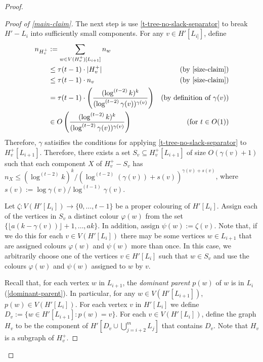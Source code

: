 \documentclass[kpfonts]{patmorin}
\theoremstyle{named}
\begin{document}
\begin{proof}
\begin{proof}[Proof of \cref{main-claim}]

       The next step is use \cref{t-tree-no-slack-separator} to break $H'-L_i$ into sufficiently small components.  For any $v\in H'[L_{i]}]$, define
       \begin{align*}
          n_{H^+_v} & := \sum_{w\in V(H^+_v)[L_{i+1}]} n_w \\
                    & \le \tau(t-1)\cdot|H^+_v| & \text{(by \cref{size-claim})} \\
                    & \le \tau(t-1)\cdot n_v & \text{(by \cref{size-claim})} \\
                    & = \tau(t-1)\cdot\left(\frac{(\log^{(t-2)}k)^k}{(\log^{(t-2)}\gamma(v))^{\gamma(v)}}\right)
                    & \text{(by definition of $\gamma(v)$)} \\
                    & \in O\left(\frac{(\log^{(t-2)}k)^k}{(\log^{(t-2)}\gamma(v))^{\gamma(v)}}\right) &\text{(for $t\in O(1)$)}
       \end{align*}
       Therefore, $\gamma$ satisifies the conditions for applying \cref{t-tree-no-slack-separator} to $H^+_v[L_{i+1}]$.  Therefore, there exists a set $S_v\subseteq H^+_v[L_{i+1}]$ of size $O(\gamma(v)+1)$ such that each component $X$ of $H^+_v-S_v$ has $n_X\le (\log^{(t-2)} k)^k/(\log^{(t-2)} (\gamma(v))+s(v))^{\gamma(v)+s(v)}$, where $s(v):=\log\gamma(v)/\log^{(t-1)}\gamma(v)$.

       Let $\zeta:V(H'[L_i])\to\{0,\ldots,t-1\}$ be a proper colouring of $H'[L_i]$.  Assign each of the vertices in $S_v$ a distinct colour $\varphi(w)$ from the set $\{\lfloor a(k-\gamma(v))\rfloor+1,\ldots,ak\}$.  In addition, assign $\psi(w):=\zeta(v)$.  Note that, if we do this for each $v\in V(H'[L_i])$ there may be some vertices $w\in L_{i+1}$ that are assigned colours $\varphi(w)$ and $\psi(w)$ more than once.  In this case, we arbitrarily choose one of the vertices $v\in H'[L_i]$ such that $w\in S_v$ and use the colours $\varphi(w)$ and $\psi(w)$ assigned to $w$ by $v$.

       Recall that, for each vertex $w$ in $L_{i+1}$, the \emph{dominant parent} $p(w)$ of $w$ is in $L_i$ (\cref{dominant-parent}).  In particular, for any $w\in V(H'[L_{i+1}])$, $p(w)\in V(H'[L_{i}])$.
       For each vertex $v$ in $H'[L_i]$ we define $D_v:=\{w\in H'[L_{i+1}]: p(w)=v\}$.  For each $v\in V(H'[L_i])$, define the graph $H_v$ to be the component of $H'[D_v\cup \bigcup_{j=i+2}^m L_j]$ that contains $D_v$.  Note that $H_v$ is a subgraph of $H^+_v$.


\end{proof}
\end{proof}
\end{document}
